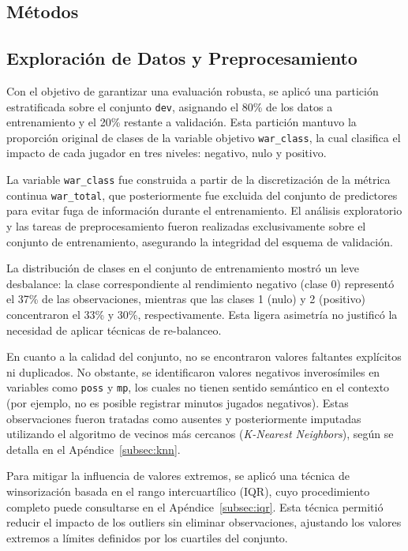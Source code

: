 \begin{multicols}{2}
\section{Métodos}
\subsection{Exploración de Datos y Preprocesamiento}

Con el objetivo de garantizar una evaluación robusta, se aplicó una partición estratificada sobre el conjunto \texttt{dev}, asignando el 80\% de los datos a entrenamiento y el 20\% restante a validación. Esta partición mantuvo la proporción original de clases de la variable objetivo \texttt{war\_class}, la cual clasifica el impacto de cada jugador en tres niveles: negativo, nulo y positivo.

La variable \texttt{war\_class} fue construida a partir de la discretización de la métrica continua \texttt{war\_total}, que posteriormente fue excluida del conjunto de predictores para evitar fuga de información durante el entrenamiento. El análisis exploratorio y las tareas de preprocesamiento fueron realizadas exclusivamente sobre el conjunto de entrenamiento, asegurando la integridad del esquema de validación.

La distribución de clases en el conjunto de entrenamiento mostró un leve desbalance: la clase correspondiente al rendimiento negativo (clase 0) representó el 37\% de las observaciones, mientras que las clases 1 (nulo) y 2 (positivo) concentraron el 33\% y 30\%, respectivamente. Esta ligera asimetría no justificó la necesidad de aplicar técnicas de re-balanceo.

En cuanto a la calidad del conjunto, no se encontraron valores faltantes explícitos ni duplicados. No obstante, se identificaron valores negativos inverosímiles en variables como \texttt{poss} y \texttt{mp}, los cuales no tienen sentido semántico en el contexto (por ejemplo, no es posible registrar minutos jugados negativos). Estas observaciones fueron tratadas como ausentes y posteriormente imputadas utilizando el algoritmo de vecinos más cercanos (\textit{K-Nearest Neighbors}), según se detalla en el Apéndice~\ref{subsec:knn}.

Para mitigar la influencia de valores extremos, se aplicó una técnica de winsorización basada en el rango intercuartílico (IQR), cuyo procedimiento completo puede consultarse en el Apéndice~\ref{subsec:iqr}. Esta técnica permitió reducir el impacto de los outliers sin eliminar observaciones, ajustando los valores extremos a límites definidos por los cuartiles del conjunto.



\end{multicols}
